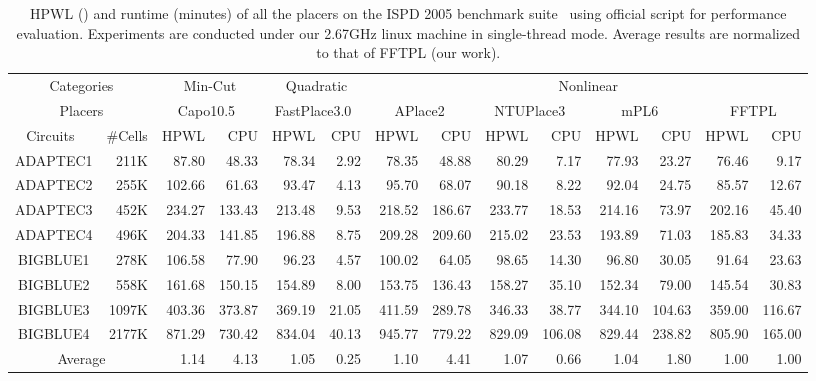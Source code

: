 \documentclass[conference,10pt]{IEEEtran}
\begin{document}
\begin{table*}[htb]
\caption{HPWL () and runtime (minutes) of all the placers on the ISPD 2005 benchmark suite~\cite{ispd05} 
using official script for performance evaluation.
Experiments are conducted under our 2.67GHz linux machine in single-thread mode. 
Average results are normalized to that of FFTPL (our work).}
\begin{small}
\begin{center}
\begin{tabular}{|c|r|r|r|r|r|r|r|r|r|r|r|r|r|} 
\hline
\multicolumn{2}{|c|}{Categories}   &
\multicolumn{2}{|c|}{Min-Cut}      &
\multicolumn{2}{|c|}{Quadratic}    &
\multicolumn{8}{|c|}{Nonlinear}   \\ \cline{1-14}
\multicolumn{2}{|c|}{Placers}      & 
\multicolumn{2}{|c|}{Capo10.5~\cite{capo}}     &
\multicolumn{2}{|c|}{FastPlace3.0~\cite{fp3}} & 
\multicolumn{2}{|c|}{APlace2~\cite{aplace2}}      &
\multicolumn{2}{|c|}{NTUPlace3~\cite{ntupl3}}    &
\multicolumn{2}{|c|}{mPL6~\cite{mpl6}}         & 
\multicolumn{2}{|c|}{FFTPL}       \\ \hline
Circuits~\cite{ispd05} &\#Cells& HPWL & CPU  & HPWL & CPU  & HPWL & CPU  & HPWL & CPU  & HPWL & CPU & HPWL & CPU \\ \hline
ADAPTEC1   & 211K  & 87.80& 48.33& 78.34& 2.92 & 78.35& 48.88& 80.29& 7.17 & 77.93& 23.27 & 76.46 &  9.17 \\ \hline
ADAPTEC2   & 255K  &102.66& 61.63& 93.47& 4.13 & 95.70& 68.07& 90.18& 8.22 & 92.04& 24.75 & 85.57 & 12.67 \\ \hline
ADAPTEC3   & 452K  &234.27&133.43&213.48& 9.53 &218.52&186.67&233.77& 18.53&214.16& 73.97 & 202.16& 45.40 \\ \hline
ADAPTEC4   & 496K  &204.33&141.85&196.88& 8.75 &209.28&209.60&215.02& 23.53&193.89& 71.03 & 185.83& 34.33 \\ \hline
BIGBLUE1   & 278K  &106.58& 77.90& 96.23& 4.57 &100.02& 64.05& 98.65& 14.30& 96.80& 30.05 & 91.64 & 23.63 \\ \hline
BIGBLUE2   & 558K  &161.68&150.15&154.89& 8.00 &153.75&136.43&158.27& 35.10&152.34& 79.00 & 145.54& 30.83 \\ \hline
BIGBLUE3   & 1097K &403.36&373.87&369.19& 21.05&411.59&289.78&346.33& 38.77&344.10& 104.63& 359.00& 116.67\\ \hline
BIGBLUE4   & 2177K &871.29&730.42&834.04& 40.13&945.77&779.22&829.09&106.08&829.44& 238.82& 805.90& 165.00\\ \hline \hline
\multicolumn{2}{|c|}{Average}  &1.14  &4.13  &1.05  & 0.25 & 1.10 & 4.41 & 1.07 & 0.66 & 1.04 & 1.80  & 1.00  & 1.00  \\ \hline
\end{tabular}
\label{tab:res}
\end{center}
\end{small}
\end{table*}
\end{document}
